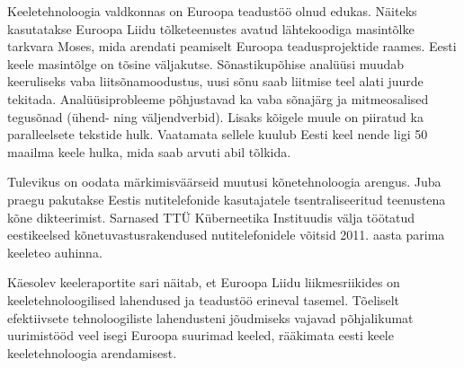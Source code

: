 \begin{multicols}{2}
Keeletehnoloogia valdkonnas on Euroopa teadustöö olnud edukas. 
Näiteks kasutatakse Euroopa Liidu tõlketeenustes avatud lähtekoodiga masintõlke tarkvara Moses, mida arendati peamiselt Euroopa teadusprojektide raames. 
Eesti keele masintõlge on tõsine väljakutse. 
Sõnastikupõhise analüüsi muudab keeruliseks vaba liitsõnamoodustus, uusi sõnu saab liitmise teel alati juurde tekitada. 
Analüüsiprobleeme põhjustavad ka vaba sõnajärg ja mitmeosalised tegusõnad (ühend- ning väljendverbid). 
Lisaks kõigele muule on piiratud ka paralleelsete tekstide hulk. 
Vaatamata sellele kuulub Eesti keel nende ligi 50 maailma keele hulka, mida saab arvuti abil tõlkida.

Tulevikus on oodata märkimisväärseid muutusi kõnetehnoloogia arengus.
Juba praegu pakutakse Eestis nutitelefonide kasutajatele tsentraliseeritud teenustena kõne dikteerimist.
Sarnased TTÜ Küberneetika Instituudis välja töötatud eestikeelsed kõnetuvastusrakendused nutitelefonidele võitsid 2011. aasta parima keeleteo auhinna.



Käesolev keeleraportite sari näitab, et Euroopa Liidu liikmesriikides on keeletehno\-loogilised lahendused ja teadustöö erineval tasemel. 
Tõeliselt efektiivsete tehnoloogiliste lahendusteni jõudmiseks vajavad põhjalikumat uurimistööd veel isegi Euroopa suurimad keeled, rääkimata eesti keele keeletehnoloogia arendamisest. 


\end{multicols}
